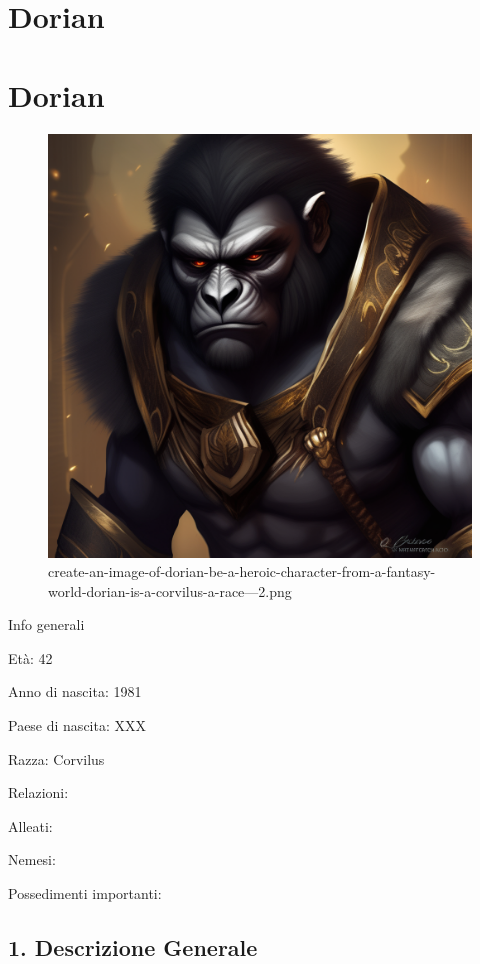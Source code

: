 \section{Dorian}
\section{Dorian}


\begin{figure}
\centering
\includegraphics{create-an-image-of-dorian-be-a-heroic-character-from-a-fantasy-world-dorian-is-a-corvilus-a-race---2.png}
\caption{create-an-image-of-dorian-be-a-heroic-character-from-a-fantasy-world-dorian-is-a-corvilus-a-race---2.png}
\end{figure}

Info generali

Età: 42

Anno di nascita: 1981

Paese di nascita: XXX

Razza: Corvilus

Relazioni:

Alleati:

Nemesi:

Possedimenti importanti:


\subsection{1. Descrizione Generale}\label{descrizione-generale}


